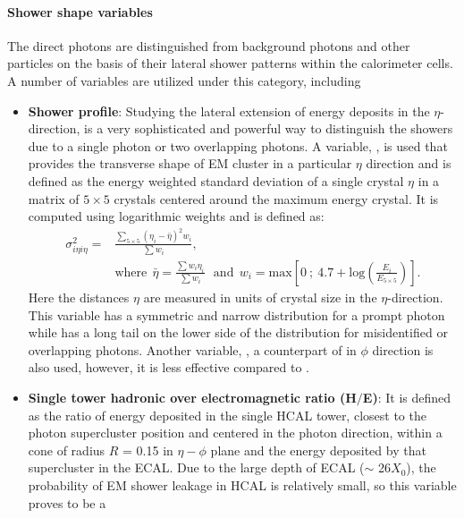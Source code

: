 \paragraph{Shower shape variables}
\hspace{\parindent} The direct photons are distinguished from background photons and other particles on the basis of their lateral shower patterns
within the calorimeter cells. A number of variables are utilized under this category, including
\vspace{-0.1in}
\begin{itemize}[leftmargin=*]
\item {\bf{Shower profile}}: Studying the lateral extension of energy deposits in the $\eta$-direction, is a very sophisticated and powerful way to distinguish
  the showers due to a single photon or two overlapping photons. A variable, \sigmaIetaIeta, is used that provides the transverse shape of EM cluster in
  a particular $\eta$ direction  and is defined as the energy weighted standard deviation
  of a single crystal $\eta$ in a matrix of $5\times5$ crystals centered around the maximum energy crystal.  It is computed using logarithmic weights and is defined as:
\begin{equation}
\begin{split}
\sigma_{i{\eta}i{\eta}}^{2} =  &\frac{{\sum_{5\times5}}(\eta_{i}-\bar{\eta})^{2}w_{i}}{{\sum}w_{i}}, \\
                           &\textrm{where}\:\:\bar{\eta} = \frac{{\sum}w_{i}\eta_{i}}{{\sum}w_{i}} \:\:\: \textrm{and} \:\: w_{i} = \textrm{max}\left[0 \: ;\: 4.7+\textrm{log}\left(\frac{E_{i}}{E_{5\times5}}\right)\right].
\end{split}
\end{equation}
Here the distances $\eta$ are measured in units of crystal size in the $\eta$-direction. This variable has a symmetric and narrow distribution for a
prompt photon while has a long tail on the lower side of the distribution for misidentified or overlapping photons.
Another variable, \sigmaIphiIphi, a counterpart of \sigmaIetaIeta in
$\phi$ direction is also used, however, it is less effective compared to \sigmaIetaIeta. 
\item {\bf{Single tower hadronic over electromagnetic ratio (H$/$E)}}: It is defined as the ratio of energy deposited in the single HCAL tower, closest to
  the photon supercluster position and centered in the photon direction, within a cone of radius $R$ = 0.15 in $\eta-\phi$ plane and the energy deposited by that supercluster in
  the ECAL. Due to the large depth of ECAL ($\sim$ 26$X_{0}$), the probability of EM shower leakage in HCAL is relatively small, so this variable proves to be a

\end{itemize}
